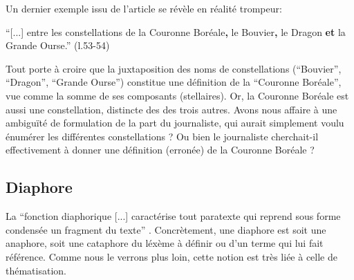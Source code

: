 \documentclass[a4paper,10pt]{article}
\begin{document}
			Un dernier exemple issu de l'article se révèle en réalité trompeur:
			\begin{center}
				\footnotesize
				\begin{minipage}{0.7\textwidth}
					``[...] entre les constellations de la Couronne Boréale\textbf{,} le Bouvier\textbf{,} le Dragon \textbf{et} la Grande Ourse.'' (l.53-54)
				\end{minipage}
			\end{center}
			Tout porte à croire que la juxtaposition des noms de constellations (``Bouvier'', ``Dragon'', ``Grande Ourse'') constitue une définition de la ``Couronne Boréale'', vue comme la somme de ses composants (stellaires). Or, la Couronne Boréale est aussi une constellation, distincte des des trois autres. Avons nous affaire à une ambiguïté de formulation de la part du journaliste, qui aurait simplement voulu énumérer les différentes constellations ? Ou bien le journaliste cherchait-il effectivement à donner une définition (erronée) de la Couronne Boréale ? 
			
			
	\subsection{Diaphore} \label{diaphore}
		La ``fonction diaphorique [...] caractérise tout paratexte qui reprend sous forme condensée un fragment du texte'' \cite{Peraya1994}. Concrètement, une diaphore est soit une anaphore, soit une cataphore du léxème à définir ou d'un terme qui lui fait référence. Comme nous le verrons plus loin, cette notion est très liée à celle de thématisation.\\
\end{document}
